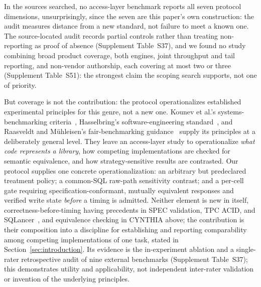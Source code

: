 In the sources searched, no access-layer benchmark reports all seven protocol dimensions,
unsurprisingly, since the seven are this paper's own construction: the audit measures distance from a
new standard, not failure to meet a known one. The source-located audit records partial controls
rather than treating non-reporting as proof of absence (Supplement Table~S37), and we found no study
combining broad product coverage, both engines, joint throughput and tail reporting, and non-vendor
authorship, each covering at most two or three (Supplement Table~S51): the strongest claim the
scoping search supports, not one of priority. 

But coverage is not the contribution: the protocol operationalizes established experimental principles for
this genre, not a new one. Kounev et al.'s systems-benchmarking
criteria~\cite{kounev2020benchmarking}, Hasselbring's software-engineering
standard~\cite{hasselbring2021benchmarking}, and Raasveldt and M\"uhleisen's fair-benchmarking
guidance~\cite{raasveldt2018fair} supply its principles at a deliberately general level. They leave an
access-layer study to operationalize \emph{what code represents a library}, how competing
implementations are checked for semantic equivalence, and how strategy-sensitive results are
contrasted. Our protocol supplies one concrete operationalization: an arbitrary but predeclared treatment policy; a common-SQL raw-path sensitivity contrast; and a per-cell gate requiring specification-conformant, mutually equivalent responses and verified write state \emph{before} a timing is admitted. Neither element is new in itself, correctness-before-timing having precedents in SPEC validation, TPC ACID, and SQLancer~\cite{rigger2020sqlancer}, and equivalence checking in CYNTHIA above; the contribution is their composition into a discipline for establishing and reporting comparability among competing implementations of one task, stated in Section~\ref{sec:introduction}. Its evidence is the in-experiment ablation and a single-rater retrospective audit of nine external benchmarks (Supplement Table~S37); this demonstrates utility and applicability, not independent inter-rater validation or invention of the underlying principles.

